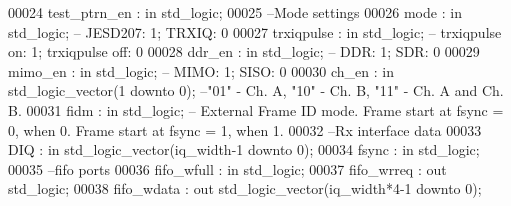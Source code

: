 \begin{DoxyCode}
00024       \textcolor{vhdlchar}{test_ptrn_en}   \textcolor{vhdlchar}{:} \textcolor{keywordflow}{in} \textcolor{comment}{std\_logic};
00025 \textcolor{keyword}{      --Mode settings}
00026       \textcolor{vhdlchar}{mode}           \textcolor{vhdlchar}{:} \textcolor{keywordflow}{in} \textcolor{comment}{std\_logic};\textcolor{keyword}{ -- JESD207: 1; TRXIQ: 0}
00027       \textcolor{vhdlchar}{trxiqpulse}     \textcolor{vhdlchar}{:} \textcolor{keywordflow}{in} \textcolor{comment}{std\_logic};\textcolor{keyword}{ -- trxiqpulse on: 1; trxiqpulse off: 0}
00028       \textcolor{vhdlchar}{ddr_en}         \textcolor{vhdlchar}{:} \textcolor{keywordflow}{in} \textcolor{comment}{std\_logic};\textcolor{keyword}{ -- DDR: 1; SDR: 0}
00029       \textcolor{vhdlchar}{mimo_en}        \textcolor{vhdlchar}{:} \textcolor{keywordflow}{in} \textcolor{comment}{std\_logic};\textcolor{keyword}{ -- MIMO: 1; SISO: 0}
00030       \textcolor{vhdlchar}{ch_en}          \textcolor{vhdlchar}{:} \textcolor{keywordflow}{in} \textcolor{comment}{std\_logic\_vector}\textcolor{vhdlchar}{(}\textcolor{vhdllogic}{}\textcolor{vhdllogic}{1} \textcolor{keywordflow}{downto} \textcolor{vhdllogic}{}\textcolor{vhdllogic}{0}\textcolor{vhdlchar}{)};\textcolor{keyword}{ --"01" - Ch. A, "10" - Ch. B, "11" - Ch. A and Ch.
       B. }
00031       \textcolor{vhdlchar}{fidm}           \textcolor{vhdlchar}{:} \textcolor{keywordflow}{in} \textcolor{comment}{std\_logic};\textcolor{keyword}{ -- External Frame ID mode. Frame start at fsync = 0, when 0. Frame
       start at fsync = 1, when 1.}
00032 \textcolor{keyword}{      --Rx interface data }
00033       \textcolor{vhdlchar}{DIQ}            \textcolor{vhdlchar}{:} \textcolor{keywordflow}{in} \textcolor{comment}{std\_logic\_vector}\textcolor{vhdlchar}{(}\textcolor{vhdlchar}{iq_width}\textcolor{vhdlchar}{-}\textcolor{vhdllogic}{}\textcolor{vhdllogic}{1} \textcolor{keywordflow}{downto} \textcolor{vhdllogic}{}\textcolor{vhdllogic}{0}\textcolor{vhdlchar}{)};
00034       \textcolor{vhdlchar}{fsync}          \textcolor{vhdlchar}{:} \textcolor{keywordflow}{in} \textcolor{comment}{std\_logic};
00035 \textcolor{keyword}{      --fifo ports }
00036       \textcolor{vhdlchar}{fifo_wfull}     \textcolor{vhdlchar}{:} \textcolor{keywordflow}{in} \textcolor{comment}{std\_logic};
00037       \textcolor{vhdlchar}{fifo_wrreq}     \textcolor{vhdlchar}{:} \textcolor{keywordflow}{out} \textcolor{comment}{std\_logic};
00038       \textcolor{vhdlchar}{fifo_wdata}     \textcolor{vhdlchar}{:} \textcolor{keywordflow}{out} \textcolor{comment}{std\_logic\_vector}\textcolor{vhdlchar}{(}\textcolor{vhdlchar}{iq_width}\textcolor{vhdlchar}{*}\textcolor{vhdllogic}{4-1} \textcolor{keywordflow}{downto} \textcolor{vhdllogic}{}\textcolor{vhdllogic}{0}\textcolor{vhdlchar}{)};

\end{DoxyCode}
